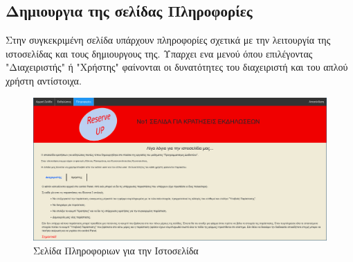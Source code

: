 \documentclass{acmart}
\begin{document}
\subsection*{Δημιουργια της σελίδας Πληροφορίες}
Στην συγκεκριμένη σελίδα υπάρχουν πληροφορίες σχετικά με την λειτουργία της ιστοσελίδας και 
τους δημιουργους της. Υπαρχει ενα μενού όπου επιλέγοντας "Διαχειριστής" ή "Χρήστης" φαίνονται 
οι δυνατότητες του διαχειριστή και του απλού χρήστη αντίστοιχα.
\begin{figure}[H]
       \includegraphics[width=\textwidth]{about.png}
       \caption{Σελίδα Πληροφοριων για την Ιστοσελίδα}
       \label{fig:about}
\end{figure}
\end{document}
